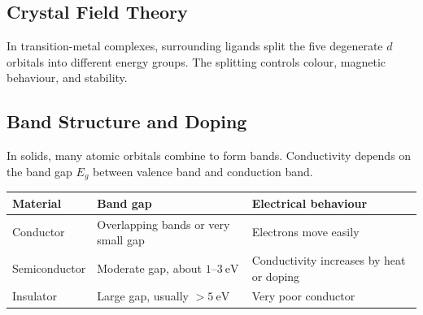 \documentclass[12pt,a4paper]{article}
\begin{document}
\subsection{Crystal Field Theory}
In transition-metal complexes, surrounding ligands split the five degenerate $d$ orbitals into different energy groups. The splitting controls colour, magnetic behaviour, and stability.

\begin{tcolorbox}[tikzbox, title={Octahedral Crystal Field Splitting}]
\centering
{}
\end{tcolorbox}

\subsection{Band Structure and Doping}
In solids, many atomic orbitals combine to form bands. Conductivity depends on the band gap $E_g$ between valence band and conduction band.

\begin{tabularx}{\linewidth}{|B{3cm}|Y|Y|}
\hline
\textbf{Material} & \textbf{Band gap} & \textbf{Electrical behaviour} \\
\hline
Conductor & Overlapping bands or very small gap & Electrons move easily \\
\hline
Semiconductor & Moderate gap, about $1$--$3\ \mathrm{eV}$ & Conductivity increases by heat or doping \\
\hline
Insulator & Large gap, usually $>5\ \mathrm{eV}$ & Very poor conductor \\
\hline
\end{tabularx}
\end{document}
